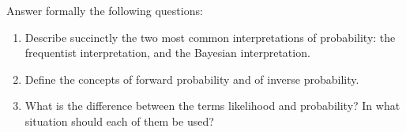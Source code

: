 \item Answer formally the following questions:
\begin{enumerate}
  \item Describe succinctly the two most common interpretations of probability: the frequentist interpretation, and the Bayesian interpretation.
  \item Define the concepts of forward probability and of inverse probability.
  \item What is the difference between the terms likelihood and probability? In what situation should each of them be used?
\end{enumerate}
